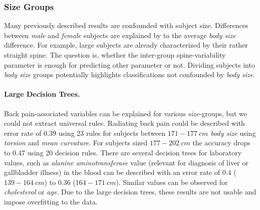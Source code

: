 \documentclass[a4paper,twoside]{style/article}
\newcommand{\com}[1]{\textcolor{orange}{\uline{#1}}}
\begin{document}
%
%

\subsubsection{Size Groups}
Many previously described results are confounded with subject size.
Differences between \emph{male} and \emph{female} subjects are explained by to the average \emph{body size} difference.
For example, large subjects are already characterized by their rather straight spine.
%
The question is, whether the inter-group spine-variability parameter is enough for predicting other parameter or not.
Dividing subjects into \emph{body size} groups potentially highlights classifications not confounded by \emph{body size}.
\paragraph{Large Decision Trees. }
Back pain-associated variables can be explained for various \emph{size}-groups, but we could not extract universal rules.
Radiating back pain could be described with error rate of $0.39$ using 23 rules for subjects between \emph{$171-177~cm$ body size} using \emph{torsion} and \emph{mean curvature}.
For subjects sized \emph{$177-202~cm$} the accuracy drops to $0.47$ using 20 decision rules.
There are several decision trees for laboratory values, such as \emph{alanine aminotransferase} value (relevant for diagnosis of liver or gallbladder illness) in the blood can be described with an error rate of $0.4$ (\emph{$139-164~cm$}) to $0.36$ (\emph{$164 - 171~cm$}).
Similar values can be observed for \emph{cholesterol} or \emph{age}.
Due to the large decision trees, these results are not usable and impose overfitting to the data.
\end{document}

